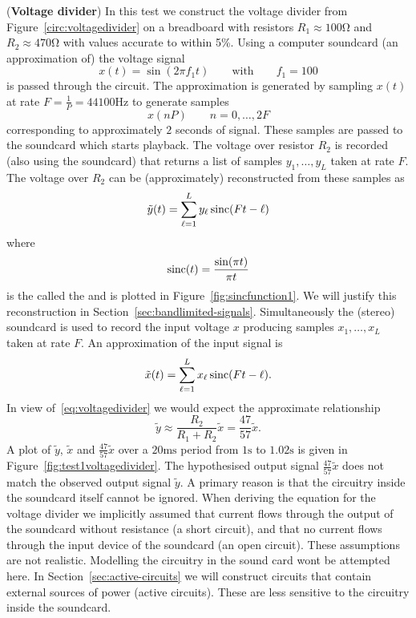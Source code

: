 \begin{test}\label{test:voltagedividertest1}
(\textbf{Voltage divider})
In this test we construct the voltage divider from Figure~\ref{circ:voltagedivider} on a breadboard with resistors $R_1 \approx 100\si{\ohm}$ and $R_2 \approx 470\si{\ohm}$ with values accurate to within 5\%.  Using a computer soundcard (an approximation of) the voltage signal 
\[
x(t) = \sin( 2 \pi f_1 t) \qquad  \text{with} \qquad  f_1 = 100
\] 
is passed through the circuit.  The approximation is generated by sampling $x(t)$ at rate $F = \frac{1}{P} = 44100\si{\hertz}$ to generate samples 
\[
x(n P) \qquad n = 0, \dots, 2 F
\]
corresponding to approximately $2$ seconds of signal.  These samples are passed to the soundcard which starts playback.  The voltage over resistor $R_2$ is recorded (also using the soundcard) that returns a list of samples $y_1,\dots,y_L$ taken at rate $F$.  The voltage over $R_2$ can be (approximately) reconstructed from these samples as
\begin{equation}\label{eq:yreconstruct}
\tilde{y}(t) = \sum_{\ell=1}^L y_\ell \operatorname{sinc}( F t - \ell )
\end{equation}
where
\begin{equation}\label{eq:sincfunction}
\operatorname{sinc}(t) = \frac{\sin(\pi t)}{\pi t}
\end{equation}
is the called the  and is plotted in Figure~\ref{fig:sincfunction1}. We will justify this reconstruction in Section~\ref{sec:bandlimited-signals}.  Simultaneously the (stereo) soundcard is used to record the input voltage $x$ producing samples $x_1,\dots,x_L$ taken at rate $F$.  An approximation of the input signal is  
\begin{equation}\label{eq:xreconstruct}
\tilde{x}(t) = \sum_{\ell=1}^L x_\ell \operatorname{sinc}( F t - \ell ).
\end{equation}
In view of~\eqref{eq:voltagedivider} we would expect the approximate relationship
\[
\tilde{y} \approx \frac{R_2}{R_1 + R_2} \tilde{x} = \frac{47}{57}\tilde{x}.
\]
A plot of $\tilde{y}$, $\tilde{x}$ and $\tfrac{47}{57}\tilde{x}$ over a $20\si{\milli\second}$ period from $1\si{\second}$ to $1.02\si{\second}$ is given in Figure~\ref{fig:test1voltagedivider}.  The hypothesised output signal $\tfrac{47}{57}\tilde{x}$ does not match the observed output signal $\tilde{y}$.  A primary reason is that the circuitry inside the soundcard itself cannot be ignored.  When deriving the equation for the voltage divider we implicitly assumed that current flows through the output of the soundcard without resistance (a short circuit), and that no current flows through the input device of the soundcard (an open circuit).  These assumptions are not realistic.  Modelling the circuitry in the sound card wont be attempted here.  In Section~\ref{sec:active-circuits} we will construct circuits that contain external sources of power (active circuits).  These are less sensitive to the circuitry inside the soundcard.  


\end{test}
